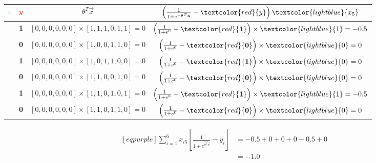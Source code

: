 \begin{table}[H]
	\centering
	\caption{}
	\label{tab:training-5}
	\begin{tabular}{*{4}{|c}|}
		\hline
		\textcolor{lightblue}{$x$} & \textcolor{red}{$y$} & $\theta^{T}\vec{x}$ & $\left( \frac{1}{1 + e^{-\vec{\theta}^{T}\vec{x}} } - \textcolor{red}{y} \right) \textcolor{lightblue}{x_{5}}$\\
		\hline
		[1, 1, 1, 0, 1, 1] & \textbf{1} & $[0, 0, 0, 0, 0, 0] \times [1, 1, 1, 0, 1, 1] = 0$ & $\left( \frac{1}{1 + e^{0}} - \textcolor{red}{\mathbf{1}} \right) \times \textcolor{lightblue}{1} = -0.5$\\
		\hline
		[1, 0, 0, 1, 1, 0] & \textbf{0} & $[0, 0, 0, 0, 0, 0] \times [1, 0, 0, 1, 1, 0] = 0$ & $\left( \frac{1}{1 + e^{0}} - \textcolor{red}{\mathbf{0}} \right) \times \textcolor{lightblue}{0} = 0$\\
		\hline
		[1, 0, 1, 1, 0, 0] & \textbf{1} & $[0, 0, 0, 0, 0, 0] \times [1, 0, 1, 1, 0, 0] = 0$ & $\left( \frac{1}{1 + e^{0}} - \textcolor{red}{\mathbf{1}} \right) \times \textcolor{lightblue}{0} = 0$\\
		\hline
		[1, 1, 0, 0, 1, 0] & \textbf{0} & $[0, 0, 0, 0, 0, 0] \times [1, 1, 0, 0, 1, 0] = 0$ & $\left( \frac{1}{1 + e^{0}} - \textcolor{red}{\mathbf{0}} \right) \times \textcolor{lightblue}{0} = 0$\\
		\hline
		[1, 1, 0, 1, 0, 1] & \textbf{1} & $[0, 0, 0, 0, 0, 0] \times [1, 1, 0, 1, 0, 1] = 0$ & $\left( \frac{1}{1 + e^{0}} - \textcolor{red}{\mathbf{1}} \right) \times \textcolor{lightblue}{1} = -0.5$\\
		\hline
		[1, 1, 0, 1, 1, 0] & \textbf{0} & $[0, 0, 0, 0, 0, 0] \times [1, 1, 0, 1, 1, 0] = 0$ & $\left( \frac{1}{1 + e^{0}} - \textcolor{red}{\mathbf{0}} \right) \times \textcolor{lightblue}{0} = 0$\\
		\hline
	\end{tabular}
\end{table}
\begin{equation*}
\begin{aligned}[eqpurple]
	\sum_{i=1}^6 x_{i5} \left[ \frac{1}{ 1 + e^{\vec{\theta^{T}}\vec{x}}} - y_{i} \right] &= -0.5 + 0 + 0 + 0 - 0.5 + 0 \\
&= -1.0
\end{aligned}
\end{equation*}
